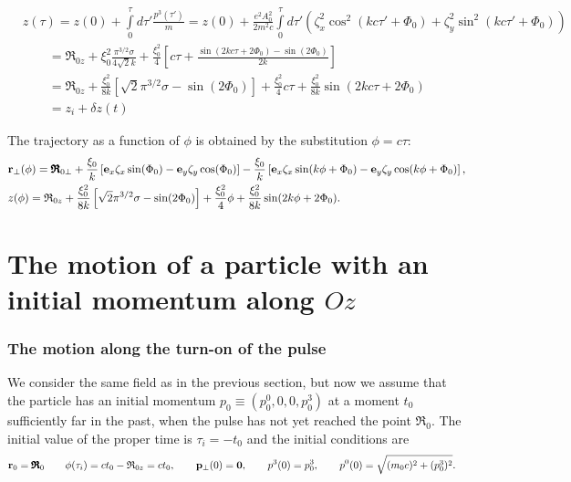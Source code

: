 \begin{align}
     & z(\tau) = z(0) + \int\limits_0^\tau d\tau' \frac{p^3(\tau')}{m} = z(0) + \frac{e^2 A_0^2 }{2m^2c} \int\limits_0^\tau d\tau' \left( \zeta_x^2\cos^2(k c\tau' + \Phi_0) + \zeta_y^2\sin^2(k c\tau' + \Phi_0) \right) \nonumber \\
     & \qquad =  {\mathfrak R}_{0z} + \xi_0^2 \frac{\pi^{3/2}\sigma}{4\sqrt{2}k} + \frac{\xi_0^2}{4}\left[c\tau + \frac{\sin(2k c\tau + 2\Phi_0) - \sin(2\Phi_0)}{2k} \right] \nonumber                                             \\& \qquad = {\mathfrak R}_{0z} + \frac{\xi_0^2}{8k}\left[{\sqrt{2}\pi^{3/2}\sigma - \sin(2\Phi_0)}\right]+\frac{\xi_0^2}{4}c\tau +\frac{\xi_0^2}{8k}\sin(2k c \tau + 2\Phi_0)\nonumber
    \\&\qquad = z_{i} + \delta z(t)
\end{align}

The trajectory as a function of $\phi$ is obtained by the substitution \(\phi = c\tau\):
\begin{align}
     & {\bf r}_{\perp}(\phi) = {\pmb{\mathfrak R}}_{0\perp} + \frac{\xi_0}{k}\left[ {\bf e}_x \zeta_x \sin(\Phi_0) - {\bf e}_y \zeta_y \cos(\Phi_0) \right]-\frac{\xi_0}{k}\left[{\bf e}_x \zeta_x \sin(k \phi + \Phi_0) - {\bf e}_y \zeta_y \cos(k \phi + \Phi_0)\right], \\
     & z(\phi) = {\mathfrak R}_{0z} + \frac{\xi_0^2}{8k}\left[{\sqrt{2}\pi^{3/2}\sigma - \sin(2\Phi_0)}\right]+\frac{\xi_0^2}{4}\phi +\frac{\xi_0^2}{8k}\sin(2k \phi + 2\Phi_0).
\end{align}
\section{The motion of a particle with an initial momentum along $Oz$}


\subsubsection{The motion along the turn-on of the pulse}
We consider the same field as in the previous section, but now we assume that the particle has an initial momentum \(p_0\equiv (p_0^0,0,0,p_0^3)\) at a moment \(t_0\) sufficiently far in the past, when the pulse has not yet reached the point \({\pmb{\mathfrak R}}_0\). The initial value of the proper time is $\tau_i = -t_0$ and the initial conditions are
\begin{align}
     & {\bf r}_0 = {\pmb{\mathfrak R}}_0\qquad \phi(\tau_i) = ct_0 - {\mathfrak R}_{0z} = ct_0, \qquad {\bf p}_\perp(0) = {\bf 0}, \qquad p^3(0) = p_0^3, \qquad p^0(0) = \sqrt{(m_0c)^2 +  (p_0^3)^2}.
\end{align}

